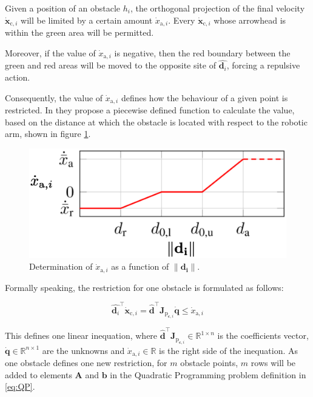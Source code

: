 Given a position of an obstacle $h_i$, the orthogonal projection of the final velocity $\dot{\mathbf{x}}_{\mathrm{c}, i}$ will be limited by a certain amount $\dot{x}_{\mathrm{a}, i}$. Every $\dot{\mathbf{x}}_{\mathrm{c}, i}$ whose arrowhead is within the green area will be permitted.

Moreover, if the value of $\dot{x}_{\mathrm{a}, i}$ is negative, then the red boundary between the green and red areas will be moved to the opposite site of $\hat{\mathbf{d}_i}$, forcing a repulsive action.

Consequently, the value of $\dot{x}_{\mathrm{a}, i}$ defines how the behaviour of a given point is restricted. In \cite{dingcollision} they propose a piecewise defined function to calculate the value, based on the distance at which the obstacle is located with respect to the robotic arm, shown in figure \ref{fig:plotxai}.

\begin{figure}[H]
    \caption[]{
        Determination of $\dot{x}_{\mathrm{a}, i}$ as a function of $\|\mathbf{d_i}\|$.
    }
    \begin{center}
    \includegraphics[width=120mm]{figs/plotxai.eps}
    \end{center}
    \label{fig:plotxai}
\end{figure}





Formally speaking, the restriction for one obstacle is formulated as follows:

\begin{equation*}
    \hat{\mathbf{d}_i}^{\top} \dot{\mathbf{x}}_{\mathrm{c}, i} =
    \hat{\mathbf{d}}^{\top} \mathbf{J}_{\mathrm{p}_{\mathbf{c}, i}} \dot{\mathbf{q}} \leq
    \dot{x}_{\mathrm{a}, i}
\end{equation*}

This defines one linear inequation, where
$\hat{\mathbf{d}}^{\top} \mathbf{J}_{\mathrm{p}_{\mathbf{c}, i}} \in \mathbb{R}^{1 \times n}$
is the coefficients vector,
$\dot{\mathbf{q}} \in \mathbb{R}^{n \times 1}$
are the unknowns and
$\dot{x}_{\mathrm{a}, i} \in \mathbb{R}$
is the right side of the inequation. As one obstacle defines one new restriction, for $m$ obstacle points, $m$ rows will be added to elements $\mathbf{A}$ and $\mathbf{b}$ in the Quadratic Programming problem definition in \ref{eq:QP}.

